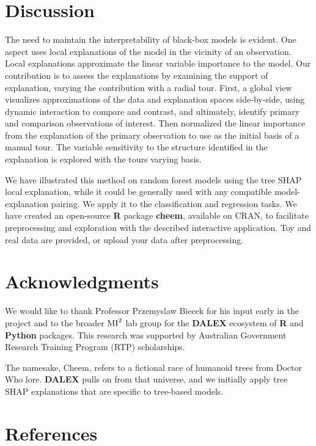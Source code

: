 \documentclass[
  article]{article}
\begin{document}
\hypertarget{sec:discussion}{%
\section{Discussion}\label{sec:discussion}}

The need to maintain the interpretability of black-box models is evident. One aspect uses local explanations of the model in the vicinity of an observation. Local explanations approximate the linear variable importance to the model. Our contribution is to assess the explanations by examining the support of explanation, varying the contribution with a radial tour. First, a global view visualizes approximations of the data and explanation spaces side-by-side, using dynamic interaction to compare and contrast, and ultimately, identify primary and comparison observations of interest. Then normalized the linear importance from the explanation of the primary observation to use as the initial basis of a manual tour. The variable sensitivity to the structure identified in the explanation is explored with the tours varying basis.

We have illustrated this method on random forest models using the tree SHAP local explanation, while it could be generally used with any compatible model-explanation pairing. We apply it to the classification and regression tasks. We have created an open-source \textbf{R} package \textbf{cheem}, available on CRAN, to facilitate preprocessing and exploration with the described interactive application. Toy and real data are provided, or upload your data after preprocessing.

\hypertarget{acknowledgments}{%
\section{Acknowledgments}\label{acknowledgments}}

We would like to thank Professor Przemyslaw Biecek for his input early in the project and to the broader \(\text{MI}^\text2\) lab group for the \textbf{DALEX} ecosystem of \textbf{R} and \textbf{Python} packages. This research was supported by Australian Government Research Training Program (RTP) scholarships.

The namesake, Cheem, refers to a fictional race of humanoid trees from Doctor Who lore. \textbf{DALEX} pulls on from that universe, and we initially apply tree SHAP explanations that are specific to tree-based models.

\hypertarget{references}{%
\section*{References}\label{references}}
\end{document}
